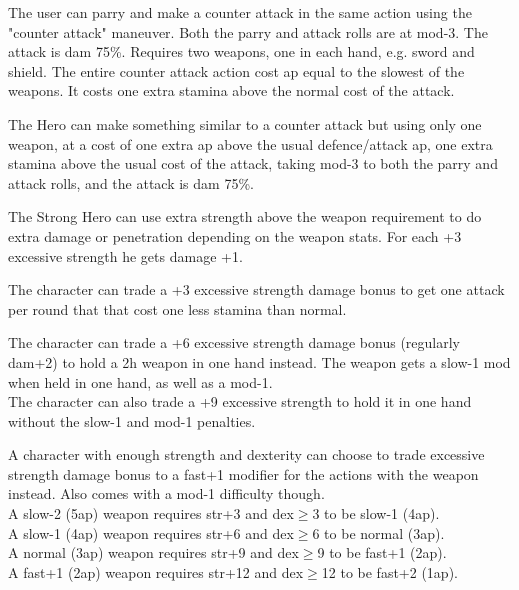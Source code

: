  The user can parry and make a counter attack in the same action using the "counter attack" maneuver. Both the parry and attack rolls are at mod-3. The attack is dam 75\%. Requires two weapons, one in each hand, e.g. sword and shield. The entire counter attack action cost ap equal to the slowest of the weapons. It costs one extra stamina above the normal cost of the attack.


 The Hero can make something similar to a counter attack but using only one weapon, at a cost of one extra ap above the usual defence/attack ap, one extra stamina above the usual cost of the attack, taking mod-3 to both the parry and attack rolls, and the attack is dam 75\%.


 The Strong Hero can use extra strength above the weapon requirement to do extra damage or penetration depending on the weapon stats. For each +3 excessive strength he gets damage +1.


 The character can trade a +3 excessive strength damage bonus to get one attack per round that that cost one less stamina than normal.


 The character can trade a +6 excessive strength damage bonus (regularly dam+2) to hold a 2h weapon in one hand instead. The weapon gets a slow-1 mod when held in one hand, as well as a mod-1. \\
The character can also trade a +9 excessive strength to hold it in one hand without the slow-1 and mod-1 penalties.


 A character with enough strength and dexterity can choose to trade excessive strength damage bonus to a fast+1 modifier for the actions with the weapon instead. Also comes with a mod-1 difficulty though. \\
A slow-2 (5ap) weapon requires str+3 and dex$\geq$3 to be slow-1 (4ap).\\
A slow-1 (4ap) weapon requires str+6 and dex$\geq$6 to be normal (3ap).\\
A normal (3ap) weapon requires str+9 and dex$\geq$9 to be fast+1 (2ap).\\
A fast+1 (2ap) weapon requires str+12 and dex$\geq$12 to be fast+2 (1ap).




